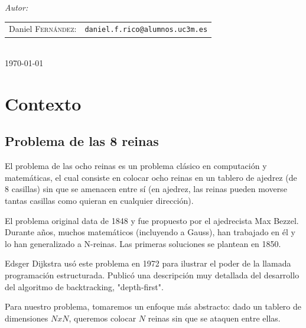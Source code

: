\documentclass[12pt]{article}
\begin{document}
\begin{titlepage}
\emph{Autor:}\\[0.7cm]

\begin{tabular}{rl}
    Daniel \textsc{Fernández}: &\texttt{daniel.f.rico@alumnos.uc3m.es}
\end{tabular}\\[2cm]



{\large \today}\\[3cm] %

\vfill %

\end{titlepage}

\tableofcontents

\newpage

\section{Contexto}

\subsection{Problema de las 8 reinas}

El problema de las ocho reinas es un problema clásico en computación y matemáticas, el cual consiste en colocar ocho reinas en un tablero de ajedrez (de 8 casillas) sin que se amenacen entre sí (en ajedrez, las reinas pueden moverse tantas casillas como quieran en cualquier dirección).
 
El problema original data de 1848 y fue propuesto por el ajedrecista Max Bezzel. Durante años, muchos matemáticos (incluyendo a Gauss), han trabajado en él y lo han generalizado a N-reinas. 
Las primeras soluciones se plantean en 1850.

Edsger Dijkstra usó este problema en 1972 para ilustrar el poder de la llamada programación estructurada. Publicó una descripción muy detallada del desarrollo del algoritmo de backtracking, "depth-first".

Para nuestro problema, tomaremos un enfoque más abstracto: dado un tablero de dimensiones $NxN$, queremos colocar $N$ reinas sin que se ataquen entre ellas.
\end{document}
